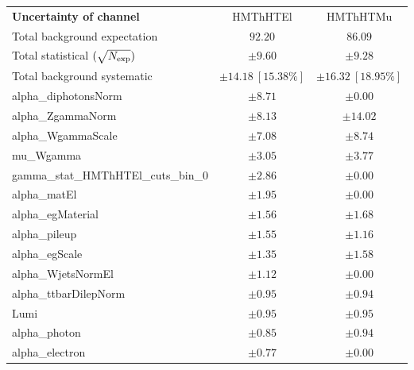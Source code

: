 
\begin{table}
\begin{center}
\setlength{\tabcolsep}{0.0pc}
\begin{tabular*}{\textwidth}{@{\extracolsep{\fill}}lcc}
\noalign{\smallskip}\hline\noalign{\smallskip}
{\bf Uncertainty of channel}                                    & HMThHTEl            & HMThHTMu            \\
\noalign{\smallskip}\hline\noalign{\smallskip}
Total background expectation             &  $92.20$        &  $86.09$       \\
\noalign{\smallskip}\hline\noalign{\smallskip}
Total statistical $(\sqrt{N_{\rm exp}})$              & $\pm 9.60$        & $\pm 9.28$       \\
Total background systematic               & $\pm 14.18\ [15.38\%] $        & $\pm 16.32\ [18.95\%] $             \\
\noalign{\smallskip}\hline\noalign{\smallskip}
\noalign{\smallskip}\hline\noalign{\smallskip}
alpha\_diphotonsNorm         & $\pm 8.71$          & $\pm 0.00$       \\
alpha\_ZgammaNorm         & $\pm 8.13$          & $\pm 14.02$       \\
alpha\_WgammaScale         & $\pm 7.08$          & $\pm 8.74$       \\
mu\_Wgamma         & $\pm 3.05$          & $\pm 3.77$       \\
gamma\_stat\_HMThHTEl\_cuts\_bin\_0         & $\pm 2.86$          & $\pm 0.00$       \\
alpha\_matEl         & $\pm 1.95$          & $\pm 0.00$       \\
alpha\_egMaterial         & $\pm 1.56$          & $\pm 1.68$       \\
alpha\_pileup         & $\pm 1.55$          & $\pm 1.16$       \\
alpha\_egScale         & $\pm 1.35$          & $\pm 1.58$       \\
alpha\_WjetsNormEl         & $\pm 1.12$          & $\pm 0.00$       \\
alpha\_ttbarDilepNorm         & $\pm 0.95$          & $\pm 0.94$       \\
Lumi         & $\pm 0.95$          & $\pm 0.95$       \\
alpha\_photon         & $\pm 0.85$          & $\pm 0.94$       \\
alpha\_electron         & $\pm 0.77$          & $\pm 0.00$       \\

\end{tabular*}
\end{center}
\end{table}
